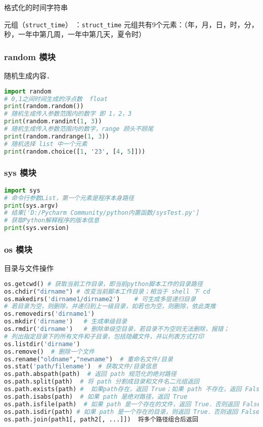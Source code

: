 格式化的时间字符串

元组（\verb|struct_time|） ：\verb|struct_time| 元组共有9个元素：（年，月，日，时，分，秒，一年中第几周，一年中第几天，夏令时）

\subsubsection{random 模块}
随机生成内容．
\begin{lstlisting}[language=python]
import random
# 0,1之间时间生成的浮点数  float
print(random.random())
# 随机生成传入参数范围内的数字 即 1，2，3
print(random.randint(1, 3))
# 随机生成传入参数范围内的数字，range 顾头不顾尾
print(random.randrange(1, 3))
# 随机选择 list 中一个元素
print(random.choice([1, '23', [4, 5]]))
\end{lstlisting}

\subsubsection{sys 模块}
\begin{lstlisting}[language=python]
import sys
# 命令行参数List，第一个元素是程序本身路径
print(sys.argv)
# 结果['D:/Pycharm Community/python内置函数/sysTest.py']
# 获取Python解释程序的版本信息
print(sys.version)
\end{lstlisting}

\subsubsection{os 模块}
目录与文件操作
\begin{lstlisting}[language=python]
os.getcwd() # 获取当前工作目录，即当前python脚本工作的目录路径
os.chdir("dirname") # 改变当前脚本工作目录；相当于 shell 下 cd
os.makedirs('dirname1/dirname2')    # 可生成多层递归目录
# 若目录为空，则删除，并递归到上一级目录，如若也为空，则删除，依此类推
os.removedirs('dirname1')
os.mkdir('dirname')   # 生成单级目录
os.rmdir('dirname')   # 删除单级空目录，若目录不为空则无法删除，报错；
# 列出指定目录下的所有文件和子目录，包括隐藏文件，并以列表方式打印
os.listdir('dirname')
os.remove()  # 删除一个文件
os.rename("oldname","newname")  # 重命名文件/目录
os.stat('path/filename')  # 获取文件/目录信息
os.path.abspath(path)  # 返回 path 规范化的绝对路径
os.path.split(path)  # 将 path 分割成目录和文件名二元组返回
os.path.exists(path) #  如果path存在，返回 True；如果 path 不存在，返回 False
os.path.isabs(path)  # 如果 path 是绝对路径，返回 True
os.path.isfile(path)  # 如果 path 是一个存在的文件，返回 True．否则返回 False
os.path.isdir(path) # 如果 path 是一个存在的目录，则返回 True．否则返回 False
os.path.join(path1[, path2[, ...]])  将多个路径组合后返回
\end{lstlisting}

